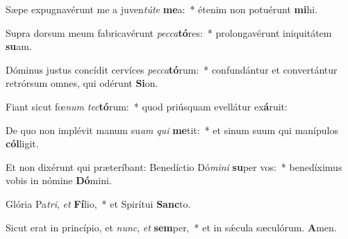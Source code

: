 \vs Sæpe expugnavérunt me a juven\textit{tú}\textit{te} \textbf{me}a:~* étenim non potuérunt \textbf{mi}hi.

\vs Supra dorsum meum fabricavérunt \textit{pec}\textit{ca}\textbf{tó}res:~* prolongavérunt iniquitátem \textbf{su}am.

\vs Dóminus justus concídit cervíces \textit{pec}\textit{ca}\textbf{tó}rum:~* confundántur et convertántur retrórsum omnes, qui odérunt \textbf{Si}on.

\vs Fiant sicut fœ\textit{num} \textit{tec}\textbf{tó}rum:~* quod priúsquam evellátur ex\textbf{á}ruit:

\vs De quo non implévit manum su\textit{am} \textit{qui} \textbf{me}tit:~* et sinum suum qui manípulos \textbf{cól}ligit.

\vs Et non dixérunt qui præteríbant: Benedíctio Dó\textit{mi}\textit{ni} \textbf{su}per vos:~* benedíximus vobis in nómine \textbf{Dó}mini.

\vs Glória Pa\textit{tri}, \textit{et} \textbf{Fí}lio,~* et Spirítui \textbf{Sanc}to.

\vs Sicut erat in princípio, et \textit{nunc}, \textit{et} \textbf{sem}per,~* et in sǽcula sæculórum. \textbf{A}men.
